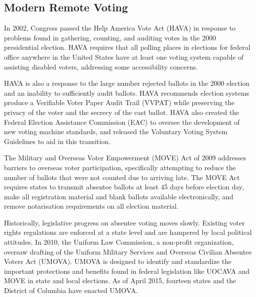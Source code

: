 \subsection{Modern Remote Voting}

In 2002, Congress passed the Help America Vote Act (HAVA) in response
to problems found in gathering, counting, and auditing votes in the
2000 presidential election. HAVA requires that all polling places in
elections for federal office anywhere in the United States have at
least one voting system capable of assisting disabled voters,
addressing some accessibility concerns.

HAVA is also a response to the large number rejected ballots in the
2000 election and an inability to sufficiently audit ballots. HAVA
recommends election systems produce a Verifiable Voter Paper Audit
Trail (VVPAT) while preserving the privacy of the voter and the
secrecy of the cast ballot. HAVA also created the Federal Election
Assistance Commission (EAC) to oversee the development of new voting
machine standards, and released the Voluntary Voting System Guidelines
to aid in this transition.

The Military and Overseas Voter Empowerment (MOVE) Act of 2009
addresses barriers to overseas voter participation, specifically
attempting to reduce the number of ballots that were not counted due
to arriving late. The MOVE Act requires states to transmit absentee
ballots at least 45 days before election day, make all registration
material and blank ballots available electronically, and remove
notarisation requirements on all election material.



Historically, legislative progress on absentee voting moves
slowly. Existing voter rights regulations are enforced at a state
level and are hampered by local political attitudes. In 2010, the
Uniform Law Commission, a non-profit organization, oversaw drafting of
the Uniform Military Services and Overseas Civilian Absentee Voters
Act (UMOVA). UMOVA is designed to identify and standardize the
important protections and benefits found in federal legislation like
UOCAVA and MOVE in state and local elections. As of April 2015,
fourteen states and the District of Columbia have enacted UMOVA.

